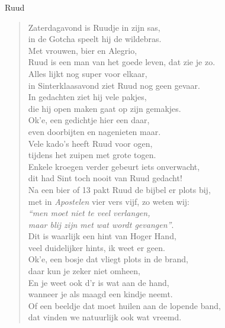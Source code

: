 \documentclass[12pt]{brief}
\date{11 december 2005}
\begin{document}
\begin{letter}{Ruud}

\opening{}


\begin{verse}

Zaterdagavond is Ruudje in zijn sas,\\
in de Gotcha speelt hij de wildebras.\\
Met vrouwen, bier en Alegrio,\\
Ruud is een man van het goede leven, dat zie je zo.\\[0.5em]

Alles lijkt nog super voor elkaar,\\
in Sinterklaasavond ziet Ruud nog geen gevaar.\\
In gedachten ziet hij vele pakjes,\\
die hij open maken gaat op zijn gemakjes.\\[0.5em]

Ok'e, een gedichtje hier een daar,\\
even doorbijten en nagenieten maar.\\
Vele kado's heeft Ruud voor ogen,\\
tijdens het zuipen met grote togen.\\[0.5em]

Enkele kroegen verder gebeurt iets onverwacht,\\
dit had Sint toch nooit van Ruud gedacht!\\
Na een bier of 13 pakt Ruud de bijbel er plots bij,\\
met in \emph{Apostelen} vier vers vijf, zo weten wij:\\
\emph{``men moet niet te veel verlangen,\\
maar blij zijn met wat wordt gevangen''}.\\[0.5em]

Dit is waarlijk een hint van Hoger Hand,\\
veel duidelijker hints, ik weet er geen.\\
Ok'e, een bosje dat vliegt plots in de brand,\\
daar kun je zeker niet omheen,\\
En je weet ook d'r is wat aan de hand,\\
wanneer je als maagd een kindje neemt.\\
Of een beeldje dat moet huilen aan de lopende band,\\
dat vinden we natuurlijk ook wat vreemd.\\[0.5em]


\end{verse}
\end{letter}
\end{document}
